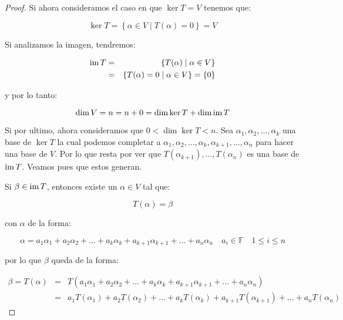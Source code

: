 \begin{proof}
			Si ahora consideramos el caso en que $\ker{T} = V$ tenemos que:

			\begin{equation*}
				\ker{T} = \left\{ \alpha \in V \mid T(\alpha) = 0 \right\} = V
			\end{equation*}

			Si analizamos la imagen, tendremos:

			\begin{eqnarray*}
				\operatorname{im}{T} & = & \left\{ T(\alpha) \mid \alpha \in V \right\} \\
				& = & \left\{ T(\alpha) = 0 \mid \alpha \in V \right\} = \{0\}
			\end{eqnarray*}

			y por lo tanto:

			\begin{equation*}
				\dim{V} = n = n + 0 = \dim{\ker{T}} + \dim{\operatorname{im}{T}}
			\end{equation*}

			Si por ultimo, ahora consideramos que $0 < \dim{\ker{T}} < n$.
			Sea $\alpha_1, \alpha_2, \dots, \alpha_k$ una base de $\ker{T}$ la cual podemos completar a $\alpha_1, \alpha_2, \dots, \alpha_k, \alpha_{k+1}, \dots, \alpha_n$ para hacer una base de $V$.
			Por lo que resta por ver que $T(\alpha_{k+1}), \dots, T(\alpha_n)$ es una base de $\operatorname{im}{T}$.
			Veamos pues que estos generan.

			Si $\beta \in \operatorname{im}{T}$, entonces existe un $\alpha \in V$ tal que:

			\begin{equation*}
				T(\alpha) = \beta
			\end{equation*}

			con $\alpha$ de la forma:

			\begin{equation*}
				\alpha = a_1 \alpha_1 + a_2 \alpha_2 + \dots + a_k \alpha_k + a_{k+1} \alpha_{k+1} + \dots + a_n \alpha_n \quad a_i \in \mathbb{F} \quad 1 \leq i \leq n
			\end{equation*}

			por lo que $\beta$ queda de la forma:

			\begin{eqnarray*}
				\beta = T(\alpha) & = & T(a_1 \alpha_1 + a_2 \alpha_2 + \dots + a_k \alpha_k + a_{k+1} \alpha_{k+1} + \dots + a_n \alpha_n) \\
				& = & a_1 T(\alpha_1) + a_2 T(\alpha_2) + \dots + a_k T(\alpha_k) + a_{k+1} T(\alpha_{k+1}) + \dots + a_n T(\alpha_n)
			\end{eqnarray*}


\end{proof}
